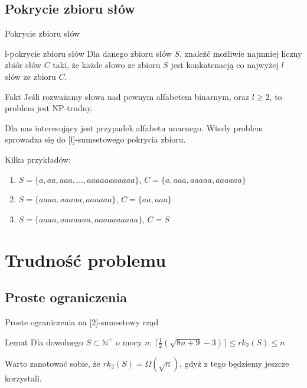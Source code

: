 \documentclass{beamer}
\newcommand{\N}{\mathbb{N}}
\begin{document}
	\subsection{Pokrycie zbioru słów}
		\begin{frame}{Pokrycie zbioru słów}

			\begin{alertblock}{l-pokrycie zbioru słów}
				Dla danego zbioru słów $ S $, znaleźć możliwie najmniej liczny zbiór słów $ C $ taki, że każde słowo ze zbioru $ S $ jest konkatenacją co najwyżej $ l $ słów ze zbioru $ C $.
			\end{alertblock}
			
			\pause
			\begin{exampleblock}{Fakt}
					Jeśli rozważamy słowa nad pewnym alfabetem binarnym, oraz $ l \geq 2 $, to problem jest NP-trudny.
			\end{exampleblock}
			
			\pause
			Dla nas interesujący jest przypadek alfabetu unarnego. Wtedy problem sprowadza się do [l]-sumsetowego pokrycia zbioru.
			
			Kilka przykładów:
            	\begin{enumerate}
				\pause \item $ S = \lbrace a,aa,aaa,\dots,aaaaaaaaaaa \rbrace $, $ C = \lbrace a,aaa,aaaaa,aaaaaa \rbrace $
				\pause \item $ S = \lbrace aaaa,aaaaa,aaaaaa \rbrace $, $ C = \lbrace aa,aaa \rbrace $
				\pause \item $ S = \lbrace aaaa,aaaaaaa,aaaaaaaaaa \rbrace $, $ C = S $
            \end{enumerate}
		\end{frame}
		
\section{Trudność problemu}
	\subsection{Proste ograniczenia}
		\begin{frame}{Proste ograniczenia na [2]-sumsetowy rząd}
            \begin{block}{Lemat}
			    Dla dowolnego $ S \subset \N^{+} $ o mocy $ n $:
                $ \lceil \frac{1}{2} ( \sqrt{8n + 9} - 3 ) \rceil \leq rk_2(S) \leq n $
            \end{block}

            \pause
            \vspace{\baselineskip}
            Warto zanotować sobie, że $ rk_2(S) = \Omega \left( \sqrt{n} \right) $, gdyż z tego będziemy jeszcze korzystali.
		\end{frame}
		
\end{document}

